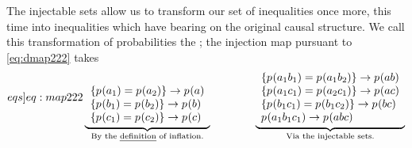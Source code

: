 The injectable sets allow us to transform our set of inequalities once more, this time into inequalities which have bearing on the original causal structure. We call this transformation of probabilities the ; the injection map pursuant to \cref{eq:dmap222} takes
\begin{align}\label[eqs]{eq:map222}
\underbrace{\begin{array}{l} \\
 \{\p{a_1}=\p{a_2}\}\to \p{a} \\
 \{\p{b_1}=\p{b_2}\}\to \p{b} \\
 \{\p{c_1}=\p{c_2}\}\to \p{c} 
\end{array}}_{\text{By the \emph{definition} of inflation.}}
\qquad\qquad
\underbrace{\begin{array}{l}
 \{\p{a_1 b_1}=\p{a_1 b_2}\}\to \p{a b} \\
 \{\p{a_1 c_1}=\p{a_2 c_1}\}\to \p{a c} \\
 \{\p{b_1 c_1}=\p{b_1 c_2}\}\to \p{b c} \\
 \p{a_1 b_1 c_1}\to \p{a b c} \\
\end{array}}_{\text{Via the injectable sets.}}
\end{align}

